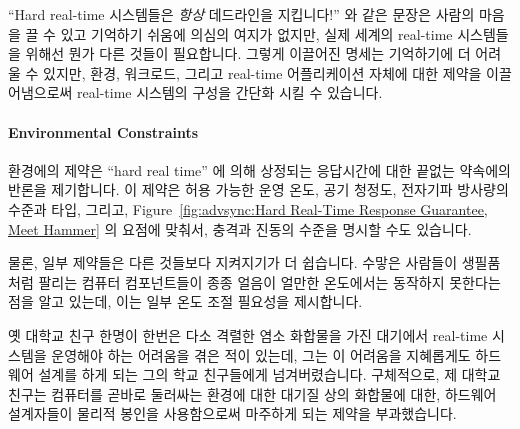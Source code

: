 ``Hard real-time 시스템들은 \emph{항상} 데드라인을 지킵니다!'' 와 같은 문장은
사람의 마음을 끌 수 있고 기억하기 쉬움에 의심의 여지가 없지만, 실제 세계의
real-time 시스템들을 위해선 뭔가 다른 것들이 필요합니다.
그렇게 이끌어진 명세는 기억하기에 더 어려울 수 있지만, 환경, 워크로드, 그리고
real-time 어플리케이션 자체에 대한 제약을 이끌어냄으로써 real-time 시스템의
구성을 간단화 시킬 수 있습니다.

\paragraph{Environmental Constraints}
\label{sec:advsync:Environmental Constraints}

환경에의 제약은 ``hard real time'' 에 의해 상정되는 응답시간에 대한 끝없는
약속에의 반론을 제기합니다.
이 제약은 허용 가능한 운영 온도, 공기 청정도, 전자기파 방사량의 수준과 타입,
그리고,
Figure~\ref{fig:advsync:Hard Real-Time Response Guarantee, Meet Hammer}
의 요점에 맞춰서, 충격과 진동의 수준을 명시할 수도 있습니다.

물론, 일부 제약들은 다른 것들보다 지켜지기가 더 쉽습니다.
수맣은 사람들이 생필품처럼 팔리는 컴퓨터 컴포넌트들이 종종 얼음이 얼만한
온도에서는 동작하지 못한다는 점을 알고 있는데, 이는 일부 온도 조절 필요성을
제시합니다.

옛 대학교 친구 한명이 한번은 다소 격렬한 염소 화합물을 가진 대기에서
real-time 시스템을 운영해야 하는 어려움을 겪은 적이 있는데, 그는 이 어려움을
지혜롭게도 하드웨어 설계를 하게 되는 그의 학교 친구들에게 넘겨버렸습니다.
구체적으로, 제 대학교 친구는 컴퓨터를 곧바로 둘러싸는 환경에 대한 대기질 상의
화합물에 대한, 하드웨어 설계자들이 물리적 봉인을 사용함으로써 마주하게 되는
제약을 부과했습니다.
\iffalse


